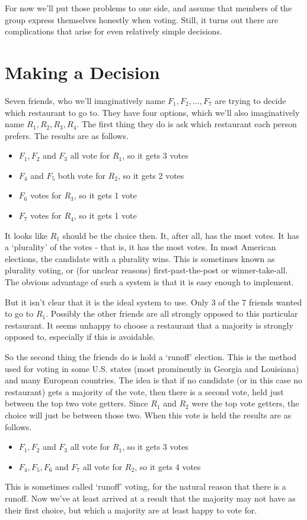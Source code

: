 \begin{multicols}{2}
For now we'll put those problems to one side, and assume that members of the group express themselves honestly when voting. Still, it turns out there are complications that arise for even relatively simple decisions.

\section{Making a Decision}
Seven friends, who we'll imaginatively name $F_1, F_2, ..., F_7$ are trying to decide which restaurant to go to. They have four options, which we'll also imaginatively name $R_1, R_2, R_3, R_4$. The first thing they do is ask which restaurant each person prefers. The results are as follows.

\begin{itemize}
\item $F_1, F_2$ and $F_3$ all vote for $R_1$, so it gets 3 votes
\item $F_4$ and $F_5$ both vote for $R_2$, so it gets 2 votes
\item $F_6$ votes for $R_3$, so it gets 1 vote
\item $F_7$ votes for $R_4$, so it gets 1 vote
\end{itemize}
It looks like $R_1$ should be the choice then. It, after all, has the most votes. It has a `plurality' of the votes - that is, it has the most votes. In most American elections, the candidate with a plurality wins. This is sometimes known as plurality voting, or (for unclear reasons) first-past-the-post or winner-take-all. The obvious advantage of such a system is that it is easy enough to implement.

But it isn't clear that it is the ideal system to use. Only 3 of the 7 friends wanted to go to $R_1$. Possibly the other friends are all strongly opposed to this particular restaurant. It seems unhappy to choose a restaurant that a majority is strongly opposed to, especially if this is avoidable.

So the second thing the friends do is hold a `runoff' election. This is the method used for voting in some U.S. states (most prominently in Georgia and Louisiana) and many European countries. The idea is that if no candidate (or in this case no restaurant) gets a majority of the vote, then there is a second vote, held just between the top two vote getters. Since $R_1$ and $R_2$ were the top vote getters, the choice will just be between those two. When this vote is held the results are as follows.

\begin{itemize}
\item $F_1, F_2$ and $F_3$ all vote for $R_1$, so it gets 3 votes
\item $F_4, F_5, F_6$ and $F_7$ all vote for $R_2$, so it gets 4 votes
\end{itemize}
This is sometimes called `runoff' voting, for the natural reason that there is a runoff. Now we've at least arrived at a result that the majority may not have as their first choice, but which a majority are at least happy to vote for.


\end{multicols}
